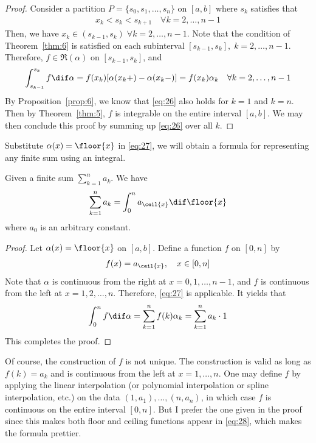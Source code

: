 \documentclass[thmcnt=section, color=blue, 12pt]{my-elegantbook}
\begin{document}
\begin{proof}
	Consider a partition $P = \{s_0, s_1, \ldots, s_n\}$ on $[a, b]$
	where $s_k$ satisfies that
	\begin{align*}
		x_k < s_k < s_{k+1} \quad \forall k = 2, \ldots, n-1
	\end{align*}
	Then, we have $x_k \in (s_{k-1}, s_k) \; \forall k = 2, \ldots, n-1 $.
	Note that the condition of Theorem~\ref{thm:6} is satisfied
	on each subinterval $[s_{k-1}, s_k], \; k=2, \ldots, n-1$.
	Therefore, $f \in \mathfrak{R}(\alpha)$ on $[s_{k-1}, s_k]$, and
	\begin{align}
		\int_{s_{k-1}}^{s_k} f \dif \alpha
		= f(x_k) [\alpha(x_k +) - \alpha(x_k -)]
		= f(x_k) \alpha_k
		\quad \forall k=2, \ldots, n-1
		\label{eq:26}
	\end{align}
	By Proposition~\ref{prop:6}, we know that \eqref{eq:26} also holds
	for $k=1$ and $k=n$.
	Then by Theorem~\ref{thm:5}, $f$ is integrable on the entire
	interval $[a, b]$.
	We may then conclude this proof by summing up \eqref{eq:26} over all $k$.
\end{proof}

Substitute $\alpha(x) = \floor{x}$ in \eqref{eq:27},
we will obtain a formula for representing any finite sum
using an integral.

\begin{theorem}
	Given a finite sum $\sum_{k=1}^n a_k$.
	We have
	\begin{align}
		\sum_{k=1}^n a_k = \int_0^n a_{\ceil{x}} \dif \floor{x}
		\label{eq:28}
	\end{align}
	where $a_0$ is an arbitrary constant.
\end{theorem}

\begin{proof}
	Let $\alpha(x) = \floor{x}$ on $[a, b]$.
	Define a function $f$ on $[0, n]$ by
	\begin{align*}
		f(x) = a_{\ceil{x}}, \quad x \in [0, n]
	\end{align*}
	Note that $\alpha$ is continuous from the right at $x=0, 1, \ldots, n-1$,
	and $f$ is continuous from the left at $x=1, 2, \ldots, n$.
	Therefore, \eqref{eq:27} is applicable.
	It yields that
	\begin{align*}
		\int_0^n f \dif \alpha
		= \sum_{k=1}^n f(k) \alpha_k
		= \sum_{k=1}^n a_k \cdot 1
	\end{align*}
	This completes the proof.
\end{proof}

Of course, the construction of $f$ is not unique.
The construction is valid as long as $f(k) = a_k$ and
is continuous from the left at $x=1, \ldots, n$.
One may define $f$ by applying the linear interpolation
(or polynomial interpolation or spline interpolation, etc.)
on the data $(1, a_1), \ldots, (n, a_n)$,
in which case $f$ is continuous on the entire interval $[0, n]$.
But I prefer the one given in the proof since this makes
both floor and ceiling functions appear in \eqref{eq:28},
which makes the formula prettier.
\end{document}

